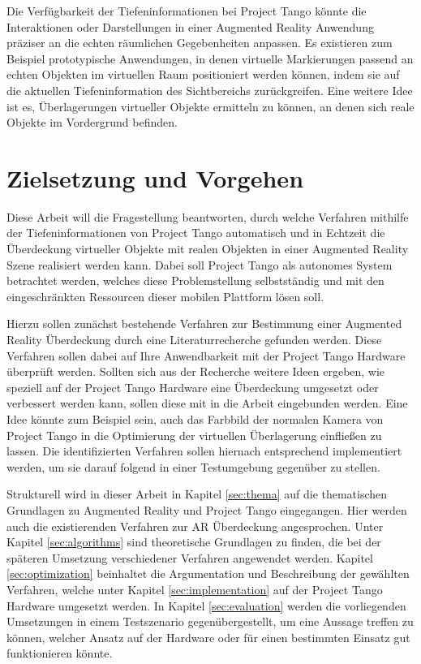 Die Verfügbarkeit der Tiefeninformationen bei Project Tango könnte die Interaktionen oder Darstellungen in einer Augmented Reality Anwendung präziser an die echten räumlichen Gegebenheiten anpassen. Es existieren zum Beispiel prototypische Anwendungen, in denen virtuelle Markierungen passend an echten Objekten im virtuellen Raum positioniert werden können, indem sie auf die aktuellen Tiefeninformation des Sichtbereichs zurückgreifen. Eine weitere Idee ist es, Überlagerungen virtueller Objekte ermitteln zu können, an denen sich reale Objekte im Vordergrund befinden.

\section{Zielsetzung und Vorgehen}

Diese Arbeit will die Fragestellung beantworten, durch welche Verfahren mithilfe der Tiefeninformationen von Project Tango automatisch und in Echtzeit die Überdeckung virtueller Objekte mit realen Objekten in einer Augmented Reality Szene realisiert werden kann. Dabei soll Project Tango als autonomes System betrachtet werden, welches diese Problemstellung selbstständig und mit den eingeschränkten Ressourcen dieser mobilen Plattform lösen soll.

Hierzu sollen zunächst bestehende Verfahren zur Bestimmung einer Augmented Reality Überdeckung durch eine Literaturrecherche gefunden werden. Diese Verfahren sollen dabei auf Ihre Anwendbarkeit mit der Project Tango Hardware überprüft werden. Sollten sich aus der Recherche weitere Ideen ergeben, wie speziell auf der Project Tango Hardware eine Überdeckung umgesetzt oder verbessert werden kann, sollen diese mit in die Arbeit eingebunden werden. Eine Idee könnte zum Beispiel sein, auch das Farbbild der normalen Kamera von Project Tango in die Optimierung der virtuellen Überlagerung einfließen zu lassen. Die identifizierten Verfahren sollen hiernach entsprechend implementiert werden, um sie darauf folgend in einer Testumgebung gegenüber zu stellen.

Strukturell wird in dieser Arbeit in Kapitel \ref{sec:thema} auf die thematischen Grundlagen zu Augmented Reality und Project Tango eingegangen. Hier werden auch die existierenden Verfahren zur AR Überdeckung angesprochen. Unter Kapitel \ref{sec:algorithms} sind theoretische Grundlagen zu finden, die bei der späteren Umsetzung verschiedener Verfahren angewendet werden. Kapitel \ref{sec:optimization} beinhaltet die Argumentation und Beschreibung der gewählten Verfahren, welche unter Kapitel \ref{sec:implementation} auf der Project Tango Hardware umgesetzt werden. In Kapitel \ref{sec:evaluation} werden die vorliegenden Umsetzungen in einem Testszenario gegenübergestellt, um eine Aussage treffen zu können, welcher Ansatz auf der Hardware oder für einen bestimmten Einsatz gut funktionieren könnte.



